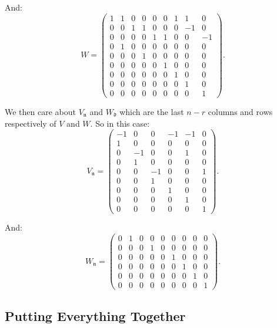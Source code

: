 \documentclass[oneside, a4paper, onecolumn, 11pt]{article}
\begin{document}
And:
\[
    W = \begin{pmatrix}
        1 & 1 & 0 & 0 & 0 & 0 & 1 & 1  & 0  \\
        0 & 0 & 1 & 1 & 0 & 0 & 0 & -1 & 0  \\
        0 & 0 & 0 & 0 & 1 & 1 & 0 & 0  & -1 \\
        0 & 1 & 0 & 0 & 0 & 0 & 0 & 0  & 0  \\
        0 & 0 & 0 & 1 & 0 & 0 & 0 & 0  & 0  \\
        0 & 0 & 0 & 0 & 0 & 1 & 0 & 0  & 0  \\
        0 & 0 & 0 & 0 & 0 & 0 & 1 & 0  & 0  \\
        0 & 0 & 0 & 0 & 0 & 0 & 0 & 1  & 0  \\
        0 & 0 & 0 & 0 & 0 & 0 & 0 & 0  & 1
    \end{pmatrix}.
\]

We then care about \(V_{\mathfrak{n}}\) and \(W_{\mathfrak{d}}\) which are the last \(n - r\) columns and rows respectively of \(V\) and \(W\). So in this case:
\[
    V_{\mathfrak{n}} = \begin{pmatrix}
        -1 & 0  & 0  & -1 & -1 & 0 \\
        1  & 0  & 0  & 0  & 0  & 0 \\
        0  & -1 & 0  & 0  & 1  & 0 \\
        0  & 1  & 0  & 0  & 0  & 0 \\
        0  & 0  & -1 & 0  & 0  & 1 \\
        0  & 0  & 1  & 0  & 0  & 0 \\
        0  & 0  & 0  & 1  & 0  & 0 \\
        0  & 0  & 0  & 0  & 1  & 0 \\
        0  & 0  & 0  & 0  & 0  & 1
    \end{pmatrix}.
\]

And:
\[
    W_{\mathfrak{n}} = \begin{pmatrix}
        0 & 1 & 0 & 0 & 0 & 0 & 0 & 0 & 0 \\
        0 & 0 & 0 & 1 & 0 & 0 & 0 & 0 & 0 \\
        0 & 0 & 0 & 0 & 0 & 1 & 0 & 0 & 0 \\
        0 & 0 & 0 & 0 & 0 & 0 & 1 & 0 & 0 \\
        0 & 0 & 0 & 0 & 0 & 0 & 0 & 1 & 0 \\
        0 & 0 & 0 & 0 & 0 & 0 & 0 & 0 & 1
    \end{pmatrix}.
\]

\subsection{Putting Everything Together}
\end{document}

